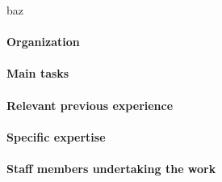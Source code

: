 \begin{sitedescription}{baz}
\paragraph{Organization}
\paragraph{Main tasks}
\paragraph{Relevant previous experience}
\paragraph{Specific expertise}
\paragraph{Staff members undertaking the work}
\end{sitedescription}

